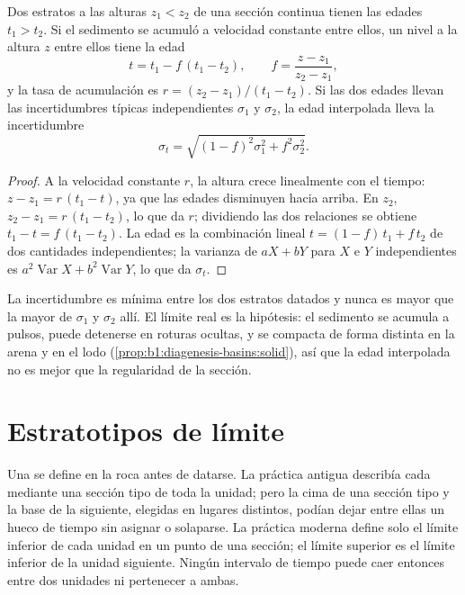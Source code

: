 \begin{proposition}\label{prop:b1:stratigraphic-scale:interpolation}
Dos estratos a las alturas $z_1 < z_2$ de una sección continua tienen las edades $t_1 > t_2$. Si el sedimento se acumuló a velocidad constante entre ellos, un nivel a la altura $z$ entre ellos tiene la edad
\[
  t = t_1 - f\,(t_1 - t_2), \qquad f = \frac{z - z_1}{z_2 - z_1},
\]
y la tasa de acumulación es $r = (z_2 - z_1)/(t_1 - t_2)$. Si las dos edades llevan las incertidumbres típicas independientes $\sigma_1$ y $\sigma_2$, la edad interpolada lleva la incertidumbre
\[
  \sigma_t = \sqrt{(1 - f)^2 \sigma_1^2 + f^2 \sigma_2^2}.
\]
\end{proposition}

\begin{proof}
A la velocidad constante $r$, la altura crece linealmente con el tiempo: $z - z_1 = r\,(t_1
- t)$, ya que las edades disminuyen hacia arriba. En $z_2$, $z_2 - z_1 = r\,(t_1 - t_2)$, lo que da $r$; dividiendo las dos relaciones se obtiene $t_1 - t = f\,(t_1 - t_2)$. La edad es la combinación lineal $t = (1 - f)\,t_1 + f\,t_2$ de dos cantidades independientes; la varianza de $a X + b Y$ para $X$ e $Y$ independientes es $a^2
\operatorname{Var} X + b^2 \operatorname{Var} Y$, lo que da $\sigma_t$.
\end{proof}

La incertidumbre es mínima entre los dos estratos datados y nunca es mayor que la mayor de $\sigma_1$ y $\sigma_2$ allí. El límite real es la hipótesis: el sedimento se acumula a pulsos, puede detenerse en roturas ocultas, y se compacta de forma distinta en la arena y en el lodo
(\cref{prop:b1:diagenesis-basins:solid}), así que la edad interpolada no es mejor que la regularidad de la sección.

\section{Estratotipos de límite}\label{sec:b1:stratigraphic-scale:gssp}

Una  se define en la roca antes de datarse. La práctica antigua describía cada  mediante una sección tipo de toda la unidad; pero la cima de una sección tipo y la base de la siguiente, elegidas en lugares distintos,
podían dejar entre ellas un hueco de tiempo sin asignar o solaparse. La práctica moderna define solo el límite inferior de cada unidad en un punto de una sección; el límite superior es el límite inferior de la unidad siguiente. Ningún intervalo de tiempo puede caer
entonces entre dos unidades ni pertenecer a ambas.

